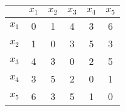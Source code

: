 \begin{table}[h]
\centering
\begin{tabular}{|c|c|c|c|c|c|}
\hline
      & $x_1$ & $x_2$ & $x_3$ & $x_4$ & $x_5$ \\
\hline
$x_1$ &  0    &  1    &  4    &  3    &  6    \\
$x_2$ &  1    &  0    &  3    &  5    &  3    \\
$x_3$ &  4    &  3    &  0    &  2    &  5    \\
$x_4$ &  3    &  5    &  2    &  0    &  1    \\
$x_5$ &  6    &  3    &  5    &  1    &  0    \\
\hline
\end{tabular}
\end{table}
